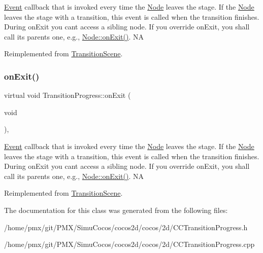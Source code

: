 \hyperlink{classEvent}{Event} callback that is invoked every time the \hyperlink{classNode}{Node} leaves the \textquotesingle{}stage\textquotesingle{}. If the \hyperlink{classNode}{Node} leaves the \textquotesingle{}stage\textquotesingle{} with a transition, this event is called when the transition finishes. During on\+Exit you can\textquotesingle{}t access a sibling node. If you override on\+Exit, you shall call its parent\textquotesingle{}s one, e.\+g., \hyperlink{classNode_ac83de835ea315e3179d4293acd8903ac}{Node\+::on\+Exit()}.  NA 

Reimplemented from \hyperlink{classTransitionScene_a45e39b658189c79428a05c3bc3173bbb}{Transition\+Scene}.

\mbox{\label{classTransitionProgress_a8682fe8c7c42a31c6796bff2e4e1fef5}} 
\subsubsection{\texorpdfstring{on\+Exit()}{onExit()}\hspace{0.1cm}{\footnotesize\ttfamily [2/2]}}
{\footnotesize\ttfamily virtual void Transition\+Progress\+::on\+Exit (\begin{DoxyParamCaption}\item[{void}]{ }\end{DoxyParamCaption})\hspace{0.3cm}{\ttfamily [override]}, {\ttfamily [virtual]}}

\hyperlink{classEvent}{Event} callback that is invoked every time the \hyperlink{classNode}{Node} leaves the \textquotesingle{}stage\textquotesingle{}. If the \hyperlink{classNode}{Node} leaves the \textquotesingle{}stage\textquotesingle{} with a transition, this event is called when the transition finishes. During on\+Exit you can\textquotesingle{}t access a sibling node. If you override on\+Exit, you shall call its parent\textquotesingle{}s one, e.\+g., \hyperlink{classNode_ac83de835ea315e3179d4293acd8903ac}{Node\+::on\+Exit()}.  NA 

Reimplemented from \hyperlink{classTransitionScene_a45e39b658189c79428a05c3bc3173bbb}{Transition\+Scene}.



The documentation for this class was generated from the following files\+:\begin{DoxyCompactItemize}
\item 
/home/pmx/git/\+P\+M\+X/\+Simu\+Cocos/cocos2d/cocos/2d/C\+C\+Transition\+Progress.\+h\item 
/home/pmx/git/\+P\+M\+X/\+Simu\+Cocos/cocos2d/cocos/2d/C\+C\+Transition\+Progress.\+cpp\end{DoxyCompactItemize}
